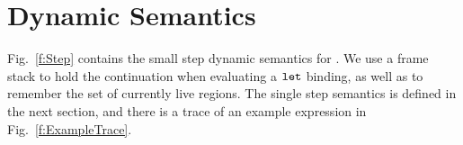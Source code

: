 
\section{Dynamic Semantics}
\label{s:Dynamics}
Fig.~\ref{f:Step} contains the small step dynamic semantics for \SystemFre. We use a frame stack to hold the continuation when evaluating a $\texttt{let}$ binding, as well as to remember the set of currently live regions. The single step semantics is defined in the next section, and there is a trace of an example expression in Fig.~\ref{f:ExampleTrace}.









